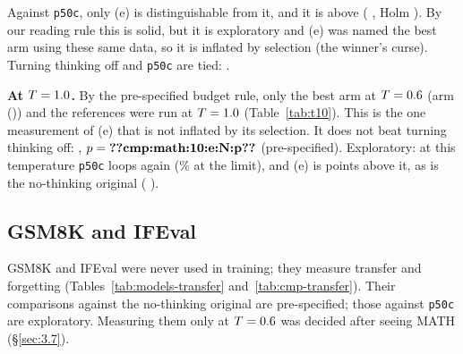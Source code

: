 \documentclass[11pt]{article}
\newcommand{\fitwidth}[1]{\resizebox{\ifdim\width>\linewidth\linewidth\else\width\fi}{!}{#1}}
\begin{document}
Against \texttt{p50c}, only (e) is distinguishable from it, and it is above ( , Holm ). By our reading rule this is solid, but it is exploratory and (e) was named the best arm using these same data, so it is inflated by selection (the winner's curse). Turning thinking off and \texttt{p50c} are tied:  .

\begin{table}[htbp]
\centering
\caption{Each arm against the original model without thinking (pre-specified; Holm family of six) and against \texttt{p50c} (exploratory; Holm family of six). MATH, $T=\TempMain$. Source: \texttt{revision/rev\_comparaciones.csv}, \texttt{revision/rev\_holm.csv}.}\label{tab:vsref}
\footnotesize\setlength{\tabcolsep}{3pt}
\fitwidth{}
\end{table}

\textbf{At $T=\TempHigh$.} By the pre-specified budget rule, only the best arm at $T=\TempMain$ (arm ()) and the references were run at $T=\TempHigh$ (Table~\ref{tab:t10}). This is the one measurement of (e) that is not inflated by its selection. It does not beat turning thinking off:  , $p=\R{cmp:math:10:e:N:p}$ (pre-specified). Exploratory: at this temperature \texttt{p50c} loops again (\% at the limit), and (e) is   points above it, as is the no-thinking original ( ).

\begin{table}[htbp]
\centering
\caption{MATH at $T=\TempHigh$: the best arm at $T=\TempMain$ and the references. Source: \texttt{revision/rev\_por\_modelo.csv}.}\label{tab:t10}
\footnotesize
\fitwidth{}
\end{table}

\subsection{GSM8K and IFEval}\label{sec:4.4}

GSM8K and IFEval were never used in training; they measure transfer and forgetting (Tables~\ref{tab:models-transfer} and~\ref{tab:cmp-transfer}). Their comparisons against the no-thinking original are pre-specified; those against \texttt{p50c} are exploratory. Measuring them only at $T=\TempMain$ was decided after seeing MATH (\S\ref{sec:3.7}).
\end{document}
